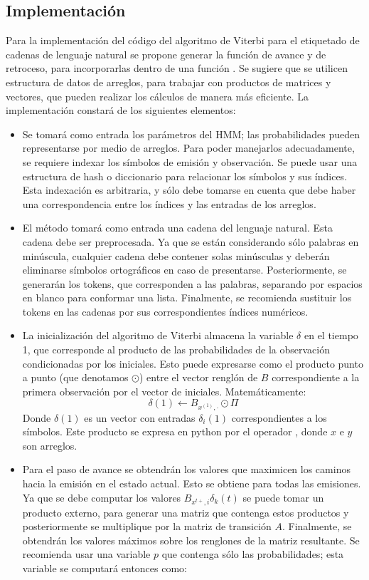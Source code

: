 \subsection{Implementación}

Para la implementación del código del algoritmo de Viterbi para el etiquetado de cadenas de lenguaje natural se propone generar la función de avance y de retroceso, para incorporarlas dentro de una función . Se sugiere que se utilicen estructura de datos de arreglos, para trabajar con productos de matrices y vectores, que pueden realizar los cálculos de manera más eficiente. La implementación constará de los siguientes elementos:

\begin{itemize}
    \item Se tomará como entrada los parámetros del HMM; las probabilidades pueden representarse por medio de arreglos. Para poder manejarlos adecuadamente, se requiere indexar los símbolos de emisión y observación. Se puede usar una estructura de hash o diccionario para relacionar los símbolos y sus índices. Esta indexación es arbitraria, y sólo debe tomarse en cuenta que debe haber una correspondencia entre los índices y las entradas de los arreglos. 
    \item El método tomará como entrada una cadena del lenguaje natural. Esta cadena debe ser preprocesada. Ya que se están considerando sólo palabras en minúscula, cualquier cadena debe contener solas minúsculas y deberán eliminarse símbolos ortográficos en caso de presentarse. Posteriormente, se generarán los tokens, que corresponden a las palabras, separando por espacios en blanco para conformar una lista. Finalmente, se recomienda sustituir los tokens en las cadenas por sus correspondientes índices numéricos.
    \item La inicialización del algoritmo de Viterbi almacena la variable $\delta$ en el tiempo 1, que corresponde al producto de las probabilidades de la observación condicionadas por los iniciales. Esto puede expresarse como el producto punto a punto (que denotamos $\odot$) entre el vector renglón de $B$ correspondiente a la primera observación por el vector de iniciales. Matemáticamente:
    $$\delta(1) \leftarrow B_{x^{(1)}, \cdot} \odot \Pi$$
    Donde $\delta(1)$ es un vector con entradas $\delta_i(1)$ correspondientes a los símbolos. Este producto se expresa en python por el operador , donde $x$ e $y$ son arreglos.
    \item Para el paso de avance se obtendrán los valores que maximicen los caminos hacia la emisión en el estado actual. Esto se obtiene para todas las emisiones. Ya que se debe computar los valores $B_{x^{t+}, i} \delta_k(t)$ se puede tomar un producto externo, para generar una matriz que contenga estos productos y posteriormente se multiplique por la matriz de transición $A$. Finalmente, se obtendrán los valores máximos sobre los renglones de la matriz resultante. Se recomienda usar una variable $p$ que contenga sólo las probabilidades; esta variable se computará entonces como:

\end{itemize}
